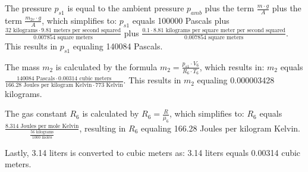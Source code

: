 The pressure \( p_{s1} \) is equal to the ambient pressure \( p_{amb} \) plus the term \( \frac{m \cdot g}{A} \) plus the term \( \frac{m_{2v} \cdot g}{A} \), which simplifies to:
\( p_{s1} \) equals 100000 Pascals plus \( \frac{32 \text{ kilograms} \cdot 9.81 \text{ meters per second squared}}{0.007854 \text{ square meters}} \) plus \( \frac{0.1 \cdot 8.81 \text{ kilograms per square meter per second squared}}{0.007854 \text{ square meters}} \).
This results in \( p_{s1} \) equaling 140084 Pascals.

The mass \( m_2 \) is calculated by the formula \( m_2 = \frac{p_{s1} \cdot V_6}{R_6 \cdot T_6} \), which results in:
\( m_2 \) equals \( \frac{140084 \text{ Pascals} \cdot 0.00314 \text{ cubic meters}}{166.28 \text{ Joules per kilogram Kelvin} \cdot 773 \text{ Kelvin}} \).
This results in \( m_2 \) equaling 0.000003428 kilograms.

The gas constant \( R_6 \) is calculated by \( R_6 = \frac{R}{\mu_6} \), which simplifies to:
\( R_6 \) equals \( \frac{8.314 \text{ Joules per mole Kelvin}}{\frac{56 \text{ kilograms}}{1000 \text{ moles}}} \), resulting in \( R_6 \) equaling 166.28 Joules per kilogram Kelvin.

Lastly, 3.14 liters is converted to cubic meters as:
3.14 liters equals 0.00314 cubic meters.